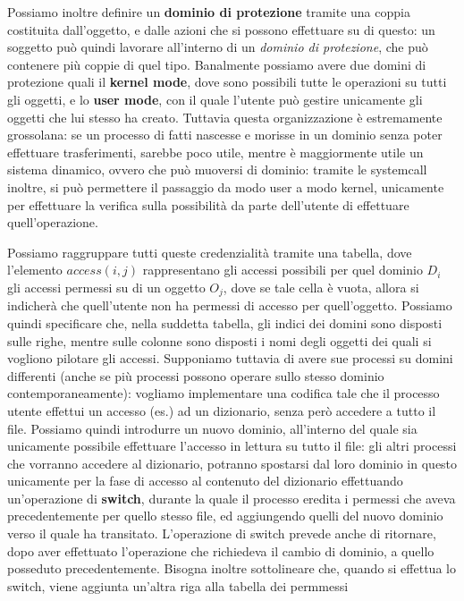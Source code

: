Possiamo inoltre definire un \textbf{dominio di protezione} tramite una coppia 
costituita dall'oggetto, e dalle azioni che si possono effettuare su di questo:
un soggetto può quindi lavorare all'interno di un \textit{dominio di protezione}, che
può contenere più coppie di quel tipo. Banalmente possiamo avere due domini di
protezione quali il \textbf{kernel mode}, dove sono possibili tutte le operazioni
su tutti gli oggetti, e lo \textbf{user mode}, con il quale l'utente può gestire
unicamente gli oggetti che lui stesso ha creato. Tuttavia questa organizzazione
è estremamente grossolana: se un processo di fatti nascesse e morisse in un
dominio senza poter effettuare trasferimenti, sarebbe poco utile, mentre è
maggiormente utile un sistema dinamico, ovvero che può muoversi di dominio:
tramite le systemcall inoltre, si può permettere il passaggio da modo user a 
modo kernel, unicamente per effettuare la verifica sulla possibilità da parte
dell'utente di effettuare quell'operazione.


Possiamo raggruppare tutti queste credenzialità tramite una tabella, dove
l'elemento $access(i,j)$ rappresentano gli accessi possibili per quel dominio
$D_i$ gli accessi permessi su di un oggetto $O_j$, dove se tale cella è vuota,
allora si indicherà che quell'utente non ha permessi di accesso per quell'oggetto.
Possiamo quindi specificare che, nella suddetta tabella, gli indici dei domini
sono disposti sulle righe, mentre sulle colonne sono disposti i nomi degli oggetti
dei quali si vogliono pilotare gli accessi.
Supponiamo tuttavia di avere sue processi su domini differenti (anche se più
processi possono operare sullo stesso dominio contemporaneamente): vogliamo 
implementare una codifica tale che il processo utente effettui un accesso (es.)
ad un dizionario, senza però accedere a tutto il file. Possiamo quindi 
introdurre un nuovo dominio, all'interno del quale sia unicamente possibile
effettuare l'accesso in lettura su tutto il file: gli altri processi che
vorranno accedere al dizionario, potranno spostarsi dal loro dominio in questo
unicamente per la fase di accesso al contenuto del dizionario effettuando 
un'operazione di \textbf{switch}, durante la quale il processo eredita i permessi
che aveva precedentemente per quello stesso file, ed aggiungendo quelli del 
nuovo dominio verso il quale ha transitato. L'operazione di switch prevede
anche di ritornare, dopo aver effettuato l'operazione che richiedeva il cambio
di dominio, a quello posseduto precedentemente. Bisogna inoltre sottolineare
che, quando si effettua lo switch, viene aggiunta un'altra riga alla tabella dei
permmessi

